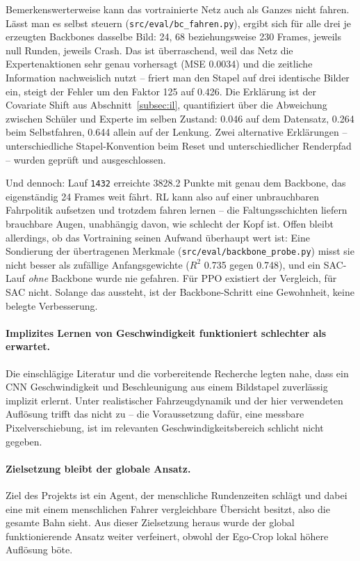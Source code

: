 Bemerkenswerterweise kann das vortrainierte Netz auch als Ganzes nicht fahren. Lässt man es selbst steuern (\texttt{src/eval/bc\_fahren.py}), ergibt sich für alle drei je erzeugten Backbones dasselbe Bild: \num{24}, \num{68} beziehungsweise \num{230} Frames, jeweils null Runden, jeweils Crash. Das ist überraschend, weil das Netz die Expertenaktionen sehr genau vorhersagt (\acs{MSE} \num{0.0034}) und die zeitliche Information nachweislich nutzt -- friert man den Stapel auf drei identische Bilder ein, steigt der Fehler um den Faktor \num{125} auf \num{0.426}. Die Erklärung ist der Covariate Shift aus Abschnitt~\ref{subsec:il}, quantifiziert über die Abweichung zwischen Schüler und Experte im selben Zustand: \num{0.046} auf dem Datensatz, \num{0.264} beim Selbstfahren, \num{0.644} allein auf der Lenkung. Zwei alternative Erklärungen -- unterschiedliche Stapel-Konvention beim Reset und unterschiedlicher Renderpfad -- wurden geprüft und ausgeschlossen.

Und dennoch: Lauf \texttt{1432} erreichte \num{3828.2} Punkte mit genau dem Backbone, das eigenständig \num{24} Frames weit fährt. \ac{RL} kann also auf einer unbrauchbaren Fahrpolitik aufsetzen und trotzdem fahren lernen -- die Faltungsschichten liefern brauchbare Augen, unabhängig davon, wie schlecht der Kopf ist. Offen bleibt allerdings, ob das Vortraining seinen Aufwand überhaupt wert ist: Eine Sondierung der übertragenen Merkmale (\texttt{src/eval/backbone\_probe.py}) misst sie nicht besser als zufällige Anfangsgewichte ($R^2$ \num{0.735} gegen \num{0.748}), und ein \ac{SAC}-Lauf \emph{ohne} Backbone wurde nie gefahren. Für \ac{PPO} existiert der Vergleich, für \ac{SAC} nicht. Solange das aussteht, ist der Backbone-Schritt eine Gewohnheit, keine belegte Verbesserung.

\paragraph{Implizites Lernen von Geschwindigkeit funktioniert schlechter als erwartet.}
Die einschlägige Literatur und die vorbereitende Recherche legten nahe, dass ein \ac{CNN} Geschwindigkeit und Beschleunigung aus einem Bildstapel zuverlässig implizit erlernt. Unter realistischer Fahrzeugdynamik und der hier verwendeten Auflösung trifft das nicht zu -- die Voraussetzung dafür, eine messbare Pixelverschiebung, ist im relevanten Geschwindigkeitsbereich schlicht nicht gegeben.

\paragraph{Zielsetzung bleibt der globale Ansatz.}
Ziel des Projekts ist ein Agent, der menschliche Rundenzeiten schlägt und dabei eine mit einem menschlichen Fahrer vergleichbare Übersicht besitzt, also die gesamte Bahn sieht. Aus dieser Zielsetzung heraus wurde der global funktionierende Ansatz weiter verfeinert, obwohl der Ego-Crop lokal höhere Auflösung böte.

